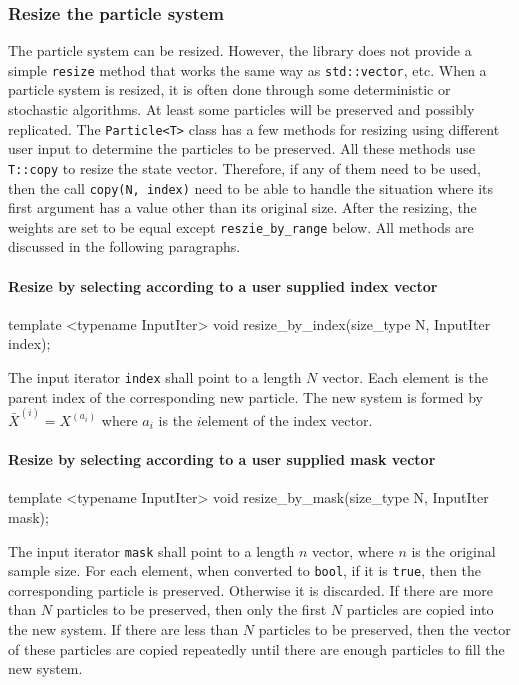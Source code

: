 \subsubsection{Resize the particle system}

The particle system can be resized. However, the library does not provide a
simple \verb|resize| method that works the same way as \verb|std::vector|, etc.
When a particle system is resized, it is often done through some deterministic
or stochastic algorithms. At least some particles will be preserved and
possibly replicated. The \verb|Particle<T>| class has a few methods for
resizing using different user input to determine the particles to be preserved.
All these methods use \verb|T::copy| to resize the state vector. Therefore, if
any of them need to be used, then the call \verb|copy(N, index)| need to be
able to handle the situation where its first argument has a value other than
its original size. After the resizing, the weights are set to be equal except
\verb|reszie_by_range| below. All methods are discussed in the following
paragraphs.

\paragraph{Resize by selecting according to a user supplied index vector}

\begin{cppcode}
  template <typename InputIter>
  void resize_by_index(size_type N, InputIter index);
\end{cppcode}
The input iterator \verb|index| shall point to a length $N$ vector. Each
element is the parent index of the corresponding new particle. The new system
is formed by $\bar{X}^{(i)} = X^{(a_i)}$ where $a_i$ is the $i$\ith element of
the index vector.

\paragraph{Resize by selecting according to a user supplied mask vector}

\begin{cppcode}
  template <typename InputIter>
  void resize_by_mask(size_type N, InputIter mask);
\end{cppcode}
The input iterator \verb|mask| shall point to a length $n$ vector, where $n$ is
the original sample size. For each element, when converted to \verb|bool|, if
it is \verb|true|, then the corresponding particle is preserved. Otherwise it
is discarded. If there are more than $N$ particles to be preserved, then only
the first $N$ particles are copied into the new system. If there are less than
$N$ particles to be preserved, then the vector of these particles are copied
repeatedly until there are enough particles to fill the new system.


